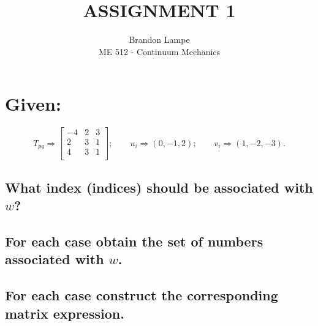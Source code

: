 \documentclass[10pt, letterpaper]{article}
\begin{document}
 
 
\title{ASSIGNMENT 1}%
\author{Brandon Lampe\\ %
ME 512 - Continuum Mechanics} %
 
\maketitle
 
\section{Given:}  %
	\begin{equation*} 
		T_{pq}  \Rightarrow
		 \begin{bmatrix} -4 & 2 & 3 \\ 2 & 3 & 1 \\ 4 & 3 & 1\\
		 \end{bmatrix}; \qquad
		u_i \Rightarrow (0, -1, 2); \qquad
		v_i \Rightarrow (1, -2, -3).
	\end{equation*}
	\subsection{What index (indices) should be associated with $ w $?}
	\subsection{For each case obtain the set of numbers associated with $ w$.}
	\subsection{For each case construct the corresponding matrix expression.}
		\indent

 
\end{document}
